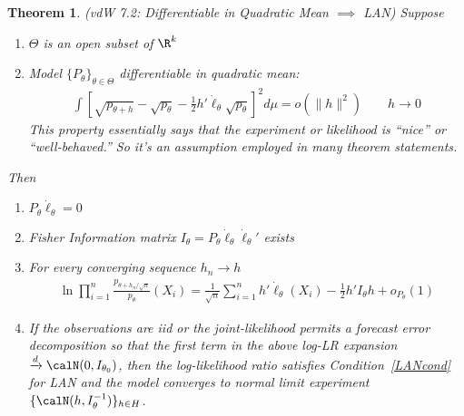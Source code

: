 \documentclass[12pt]{article}
\theoremstyle{plain}
\newtheorem{thm}{Theorem}[section]
\theoremstyle{definition}
\theoremstyle{remark}
\newcommand{\ra}{\rightarrow}
\newcommand{\dto}{\xrightarrow{d}}
\newcommand{\sumin}{\sum^n_{i=1}}
\newcommand{\prodin}{\prod^n_{i=1}}
\begin{document}
\begin{thm}
\emph{(vdW 7.2: Differentiable in Quadratic Mean $\implies$ LAN)}
Suppose
\begin{enumerate}[label=\emph{(\roman*)}]
  \item $\Theta$ is an open subset of $\R^k$
  \item Model $\{P_\theta\}_{\theta\in\Theta}$ differentiable in
    quadratic mean:
    \begin{align}
      \int
      \left[
        \sqrt{p_{\theta+h}}
        -
        \sqrt{p_{\theta}}
        -
        \frac{1}{2}
        h'\dot{\ell}_\theta
        \sqrt{p_\theta}
      \right]^2
      d\mu
      =
      o(\lVert h\rVert^2)
      \qquad
      h\ra 0
    \end{align}
    This property essentially says that the experiment or likelihood is
    ``nice'' or ``well-behaved.''
    So it's an assumption employed in many theorem statements.
\end{enumerate}
Then
\begin{enumerate}[label=\emph{(\roman*)}]
  \item $P_\theta\dot{\ell}_{\theta}=0$
  \item Fisher Information matrix $I_\theta =
    P_{\theta}\dot{\ell}_\theta\dot{\ell}_\theta'$
    exists
  \item For every converging sequence $h_n\ra h$
    \begin{align*}
      \ln \prodin
      \frac{p_{\theta+h_n/\sqrt{n}}}{p_\theta}
      (X_i)
      =
      \frac{1}{\sqrt{n}}
      \sumin h'\dot{\ell}_\theta(X_i)
      -
      \frac{1}{2}
      h' I_{\theta}
      h
      +
      o_{P_\theta}(1)
    \end{align*}

  \item
    If the observations are iid or the joint-likelihood permits a
    forecast error decomposition so that the first term in the above
    log-LR expansion $\dto \calN(0,I_{\theta_0})$, then the
    log-likelihood ratio satisfies Condition~\ref{LANcond} for LAN and
    the model converges to normal limit experiment
    $\{\calN(h,I_{\theta}^{-1})\}_{h\in H}$.

\end{enumerate}
\end{thm}
\end{document}
